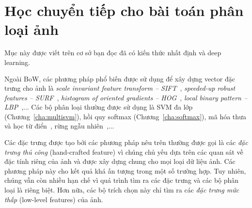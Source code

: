 \section{Học chuyển tiếp cho bài toán phân loại ảnh}
Mục này được viết trên cơ sở bạn đọc đã có kiến thức nhất định và deep learning.

Ngoài BoW, các phương pháp phổ biến được sử dụng để xây dựng vector đặc trưng cho ảnh là \textit{scale invariant feature transform -- SIFT}~\cite{lowe1999object}, \textit{speeded-up robust features -- SURF}~\cite{bay2006surf}, \textit{histogram of oriented gradients -- HOG}~\cite{dalal2005histograms}, \textit{local binary pattern -- LBP}~\cite{lowe1999object},... Các bộ phân loại thường được sử dụng là SVM đa lớp (Chương~\ref{cha:multisvm}), {hồi quy softmax} (Chương~\ref{cha:softmax}), mã hóa thưa và học từ điển~\cite{wright2009robust,vu2016histopathological,vu2016fast}, rừng ngẫu nhiên~\cite{liaw2002classification},... 



Các đặc trưng được tạo bởi các phương pháp nêu trên thường được gọi là các
\textit{đặc trưng thủ công} ({hand-crafted feature}) vì chúng chủ yếu dựa
trên các quan sát về đặc tính riêng của ảnh và được xây dựng chung cho mọi loại
dữ liệu ảnh. Các phương pháp này cho kết quả khá ấn tượng trong một số trường
hợp. Tuy nhiên, chúng vẫn còn nhiều hạn chế vì quá trình tìm ra các đặc trưng và
các bộ phân loại là riêng biệt. Hơn nữa, các bộ trích chọn này chỉ tìm ra các
\textit{đặc trưng mức thấp} ({low-level features}) của ảnh.

